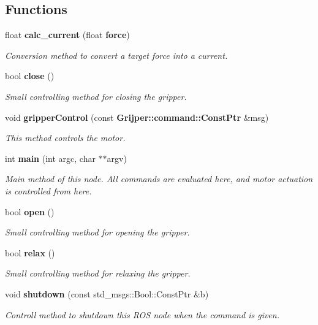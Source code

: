 \subsection*{Functions}
\begin{DoxyCompactItemize}
\item 
float {\bf calc\-\_\-current} (float {\bf force})
\begin{DoxyCompactList}\small\item\em Conversion method to convert a target force into a current. \end{DoxyCompactList}\item 
bool {\bf close} ()
\begin{DoxyCompactList}\small\item\em Small controlling method for closing the gripper. \end{DoxyCompactList}\item 
void {\bf gripper\-Control} (const {\bf Grijper\-::command\-::\-Const\-Ptr} \&msg)
\begin{DoxyCompactList}\small\item\em This method controls the motor. \end{DoxyCompactList}\item 
int {\bf main} (int argc, char $\ast$$\ast$argv)
\begin{DoxyCompactList}\small\item\em Main method of this node. All commands are evaluated here, and motor actuation is controlled from here. \end{DoxyCompactList}\item 
bool {\bf open} ()
\begin{DoxyCompactList}\small\item\em Small controlling method for opening the gripper. \end{DoxyCompactList}\item 
bool {\bf relax} ()
\begin{DoxyCompactList}\small\item\em Small controlling method for relaxing the gripper. \end{DoxyCompactList}\item 
void {\bf shutdown} (const std\-\_\-msgs\-::\-Bool\-::\-Const\-Ptr \&b)
\begin{DoxyCompactList}\small\item\em Controll method to shutdown this R\-O\-S node when the command is given. \end{DoxyCompactList}\end{DoxyCompactItemize}
